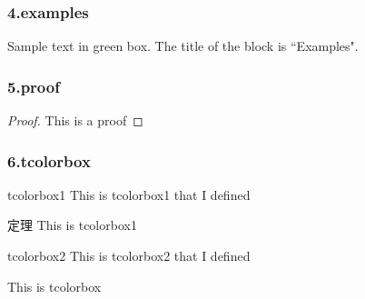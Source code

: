 \begin{frame}
    \frametitle{4.examples}
	\begin{examples}
		Sample text in green box. The title of the block is ``Examples".
	\end{examples}
\end{frame}

\begin{frame}
    \frametitle{5.proof}
    \begin{proof}{}
      This is a proof
    \end{proof}
\end{frame}

\begin{frame}
    \frametitle{6.tcolorbox}
    \begin{tcolorbox1}{tcolorbox1}
      This is tcolorbox1 that I defined
    \end{tcolorbox1}
    \begin{tcolorbox1}[2]{定理}
      This is tcolorbox1
    \end{tcolorbox1}
    \begin{tcolorbox2}{tcolorbox2}
      This is tcolorbox2 that I defined
    \end{tcolorbox2}
    \begin{tcolorbox}[title=tcolorbox]
      This is tcolorbox
    \end{tcolorbox}
\end{frame}

